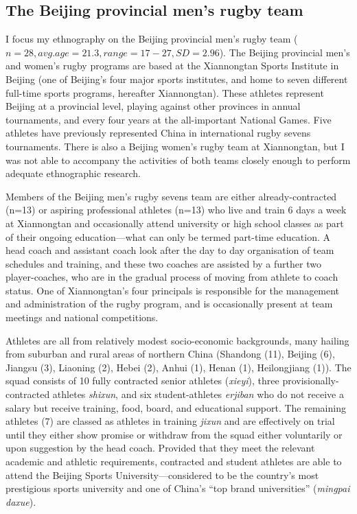 \subsection{The Beijing provincial men's rugby team}
I focus my ethnography on the Beijing provincial men's rugby team ($n=28, avg. age=21.3, range = 17-27, SD = 2.96$).  The Beijing provincial men's and women's rugby programs are based at the Xiannongtan Sports Institute in Beijing (one of Beijing's four major sports institutes, and home to seven different full-time sports programs, hereafter Xiannongtan).  These athletes represent Beijing at a provincial level, playing against other provinces in annual tournaments, and every four years at the all-important National Games.  Five athletes have previously represented China in international rugby sevens tournaments.  There is also a Beijing women's rugby team at Xiannongtan, but I was not able to accompany the activities of both teams closely enough to perform adequate ethnographic research.

Members of the Beijing men's rugby sevens team are either already-contracted (n=13) or aspiring professional athletes (n=13) who live and train 6 days a week at Xiannongtan and occasionally attend university or high school classes as part of their ongoing education---what can only be termed part-time education.  A head coach and assistant coach look after the day to day organisation of team schedules and training, and these two coaches are assisted by a further two player-coaches, who are in the gradual process of moving from athlete to coach status.  One of Xiannongtan's four principals is responsible for the management and administration of the rugby program, and is occasionally present at team meetings and national competitions.

Athletes are all from relatively modest socio-economic backgrounds, many hailing from suburban and rural areas of northern China (Shandong (11), Beijing (6), Jiangsu (3), Liaoning (2), Hebei (2), Anhui (1), Henan (1), Heilongjiang (1)).  The squad consists of 10 fully contracted senior athletes (\textit{xieyi}), three provisionally-contracted athletes \textit{shixun}, and six student-athletes \textit{erjiban} who do not receive a salary but receive training, food, board, and educational support.  The remaining athletes (7) are classed as athletes in training \textit{jixun} and are effectively on trial until they either show promise or withdraw from the squad either voluntarily or upon suggestion by the head coach.  Provided that they meet the relevant academic and athletic requirements, contracted and student athletes are able to attend the Beijing Sports University—considered to be the country's most prestigious sports university and one of China's ``top brand universities'' (\textit{mingpai daxue}).

